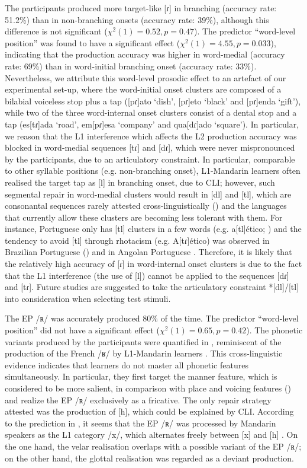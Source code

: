 \documentclass[output=paper]{../langscibook}
\begin{document}
The participants produced more target-like [ɾ] in branching (accuracy rate: 51.2\%) than in non-branching onsets (accuracy rate: 39\%), although this difference is not significant ($\chi^2(1) = 0.52, p=0.47$). The predictor “word-level position” was found to have a significant effect ($\chi^2(1) = 4.55, p=0.033$), indicating that the production accuracy was higher in word-medial (accuracy rate: 69\%) than in word-initial branching onset (accuracy rate: 33\%). Nevertheless, we attribute this word-level prosodic effect to an artefact of our experimental set-up, where the word-initial onset clusters are composed of a bilabial voiceless stop plus a tap ([pɾ]ato `dish', [pɾ]eto `black' and [pɾ]enda `gift'), while two of the three word-internal onset clusters consist of a dental stop and a tap (es[tɾ]ada `road', em[pɾ]esa `company' and qua[dɾ]ado `square'). In particular, we reason that the L1 interference which affects the L2 production accuracy was blocked in word-medial sequences [tɾ] and [dɾ], which were never mispronounced by the participants, due to an articulatory constraint. In particular, comparable to other syllable positions (e.g. non-branching onset), L1-Mandarin learners often realised the target tap as [l] in branching onset, due to CLI; however, such segmental repair in word-medial clusters would result in [dl] and [tl], which are consonantal sequences rarely attested cross-linguistically (\citealt{HalleBest2007}) and the languages that currently allow these clusters are becoming less tolerant with them. For instance, Portuguese only has [tl] clusters in a few words (e.g. a[tl]ético; \citealt{MateusAndrade2000}) and the tendency to avoid [tl] through rhotacism (e.g. A[tɾ]ético) was observed in Brazilian Portuguese (\citealt{Cristofaro-Silva2003}) and in Angolan Portuguese \citep{Miguel2018}. Therefore, it is likely that the relatively high accuracy of [ɾ] in word-internal onset clusters is due to the fact that the L1 interference (the use of [l]) cannot be applied to the sequences [dɾ] and [tɾ]. Future studies are suggested to take the articulatory constraint *[dl]/[tl] into consideration when selecting test stimuli.

The EP /ʀ/ was accurately produced 80\% of the time. The predictor “word-level position” did not have a significant effect ($\chi^2(1) = 0.65, p=0.42$). The phonetic variants produced by the participants were quantified in , reminiscent of the production of the French /ʁ/ by L1-Mandarin learners \citep{Steele2002}. This cross-linguistic evidence indicates that learners do not master all phonetic features simultaneously. In particular, they first target the manner feature, which is considered to be more salient, in comparison with place and voicing features (\citealt{ColantoniSteele2008}) and realize the EP /ʀ/ exclusively as a fricative. The only repair strategy attested was the production of [h], which could be explained by CLI. According to the prediction in , it seems that the EP /ʀ/ was processed by Mandarin speakers as the L1 category /x/, which alternates freely between [x] and [h] \citep{Lin2007}. On the one hand, the velar realisation overlaps with a possible variant of the EP /ʀ/; on the other hand, the glottal realisation was regarded as a deviant production.
\end{document}
